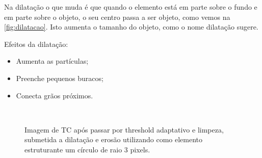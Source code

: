 Na dilatação o que muda é que quando o elemento está em parte sobre o fundo e em parte sobre o objeto, o seu centro passa a ser objeto, como vemos na \ref{fig:dilatacao}. Isto aumenta o tamanho do objeto, como o nome dilatação sugere.

Efeitos da dilatação:

\begin{itemize}
 \item Aumenta as partículas;
 \item Preenche pequenos buracos;
 \item Conecta grãos próximos.
\end{itemize}

\begin{figure}[ht]
 \begin{center}
  \\
 \end{center}
 \caption{Imagem de TC após passar por threshold adaptativo e limpeza, submetida a dilatação e erosão utilizando como elemento estruturante um círculo de raio 3 pixels.}
 \label{fig:erosao_dilatacao}
\end{figure}

